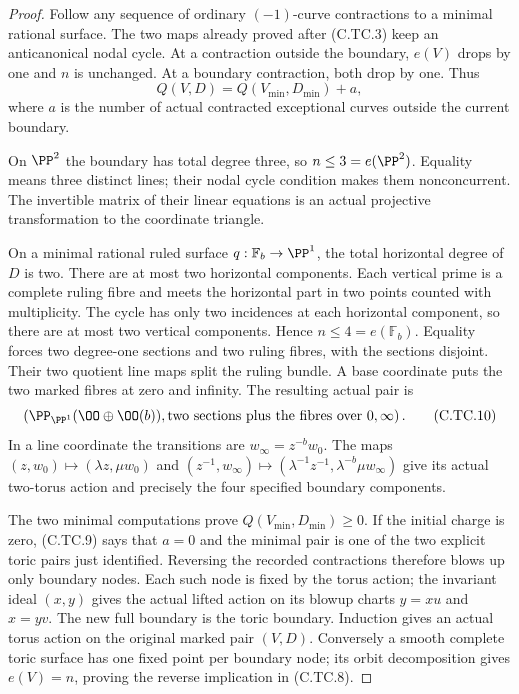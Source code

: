 \begin{proof}
Follow any sequence of ordinary
$(-1)$-curve contractions to a
minimal rational surface. The two
maps already proved after (C.TC.3)
keep an anticanonical nodal cycle.
At a contraction outside the boundary,
$e(V)$ drops by one and $n$ is
unchanged. At a boundary contraction,
both drop by one. Thus
\[
 Q(V,D)=Q(V_{\min},D_{\min})+a,
\tag{C.TC.9}
\]
where $a$ is the number of actual
contracted exceptional curves outside
the current boundary.

On $\PP^2$ the boundary has total
degree three, so $n\le3=e(\PP^2)$.
Equality means three distinct lines;
their nodal cycle condition makes
them nonconcurrent. The invertible
matrix of their linear equations is
an actual projective transformation
to the coordinate triangle.

On a minimal rational ruled surface
$q:\mathbb F_b\to\PP^1$, the total
horizontal degree of $D$ is two.
There are at most two horizontal
components. Each vertical prime is
a complete ruling fibre and meets
the horizontal part in two points
counted with multiplicity. The cycle
has only two incidences at each
horizontal component, so there are
at most two vertical components.
Hence $n\le4=e(\mathbb F_b)$.
Equality forces two degree-one
sections and two ruling fibres,
with the sections disjoint.
Their two quotient line maps split
the ruling bundle. A base coordinate
puts the two marked fibres at zero
and infinity. The resulting actual
pair is
\[
 \left(\PP_{\PP^1}(\OO\oplus\OO(b)),
        \text{two sections plus the fibres over }0,\infty\right).
\tag{C.TC.10}
\]
In a line coordinate the transitions
are $w_\infty=z^{-b}w_0$.
The maps $(z,w_0)\mapsto(\lambda z,\mu w_0)$
and $(z^{-1},w_\infty)\mapsto
(\lambda^{-1}z^{-1},\lambda^{-b}\mu w_\infty)$
give its actual two-torus action
and precisely the four specified
boundary components.

The two minimal computations prove
$Q(V_{\min},D_{\min})\ge0$.
If the initial charge is zero,
(C.TC.9) says that $a=0$ and
the minimal pair is one of the
two explicit toric pairs just
identified. Reversing the recorded
contractions therefore blows up
only boundary nodes. Each such
node is fixed by the torus action;
the invariant ideal $(x,y)$ gives
the actual lifted action on its
blowup charts $y=xu$ and $x=yv$.
The new full boundary is the
toric boundary. Induction gives
an actual torus action on the
original marked pair $(V,D)$.
Conversely a smooth complete
toric surface has one fixed
point per boundary node; its
orbit decomposition gives
$e(V)=n$, proving the reverse
implication in (C.TC.8).


\end{proof}
